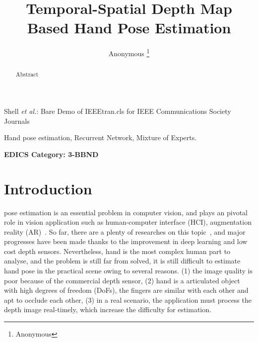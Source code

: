 \documentclass[journal,comsoc]{IEEEtran}
\begin{document}
\title{Temporal-Spatial Depth Map Based Hand Pose Estimation}

\author{{Anonymous}%
\thanks{Anonymous}}

%
{Shell \MakeLowercase{\textit{et al.}}: Bare Demo of IEEEtran.cls for IEEE Communications Society Journals}

\maketitle

\begin{abstract}
Abstract
\end{abstract}

\begin{IEEEkeywords}
Hand pose estimation, Recurrent Network, Mixture of Experts.
\end{IEEEkeywords}


\ifCLASSOPTIONpeerreview
\begin{center} \bfseries EDICS Category: 3-BBND \end{center}
\fi
%
\IEEEpeerreviewmaketitle


\section{Introduction}\label{sec:introduction}
 pose estimation is an essential problem in computer vision, and plays an pivotal
role in vision application such as human-computer interface (HCI), augmentation reality (AR)~\cite{barsoum2016articulated}. So
far, there are a plenty of researches on this topic~\cite{guo2017region, quach2016depth, ge2017_3D,
wan2017crossing}, and major progresses have been made thanks to the improvement in deep learning
and low cost depth sensors. Nevertheless, hand is the most complex human part to analyse, and the
problem is still far from solved, it is still difficult to estimate hand pose in the practical scene
owing to several reasons. (1) the image quality is poor because of the commercial depth sensor, (2)
hand is a articulated object with high degrees of freedom (DoFs), the fingers are similar with each
other and apt to occlude each other, (3) in a real scenario, the application must process the depth
image real-timely, which increase the difficulty for estimation.
\end{document}
